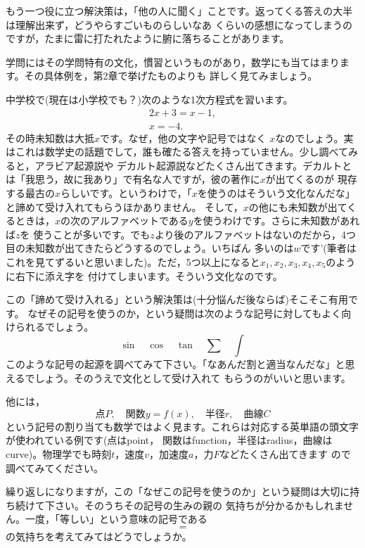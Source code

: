 \documentclass[./main]{subfiles}
\begin{document}
もう一つ役に立つ解決策は，「他の人に聞く」ことです。返ってくる答えの大半は理解出来ず，どうやらすごいものらしいなあ
くらいの感想になってしまうのですが，たまに雷に打たれたように腑に落ちることがあります。


学問にはその学問特有の文化，慣習というものがあり，数学にも当てはまります。その具体例を，第2章で挙げたものよりも
詳しく見てみましょう。

中学校で(現在は小学校でも？)次のような1次方程式を習います。
\begin{gather*}
2x + 3 = x - 1, \\
x = -4.
\end{gather*}
その時未知数は大抵$x$です。なぜ，他の文字や記号ではなく
$x$なのでしょう。実はこれは数学史の話題でして，誰も確たる答えを持っていません。少し調べてみると，アラビア起源説や
デカルト起源説などたくさん出てきます。デカルトとは「我思う，故に我あり」で有名な人ですが，彼の著作に$x$が出てくるのが
現存する最古の$x$らしいです。というわけで，「$x$を使うのはそういう文化なんだな」と諦めて受け入れてもらうほかありません。
そして，$x$の他にも未知数が出てくるときは，$x$の次のアルファベットである$y$を使うわけです。さらに未知数があれば$z$を
使うことが多いです。でも$z$より後のアルファベットはないのだから，4つ目の未知数が出てきたらどうするのでしょう。いちばん
多いのは$w$です'(筆者はこれを見てずるいと思いました)。ただ，5つ以上になると$x_1,x_2,x_3,x_4,x_5$のように右下に添え字を
付けてしまいます。そういう文化なのです。

この「諦めて受け入れる」という解決策は(十分悩んだ後ならば)そこそこ有用です。
なぜその記号を使うのか，という疑問は次のような記号に対してもよく向けられるでしょう。
\[
\sin \quad \cos \quad \tan \quad \sum \quad \int
\]
このような記号の起源を調べてみて下さい。「なあんだ割と適当なんだな」と思えるでしょう。そのうえで文化として受け入れて
もらうのがいいと思います。

他には，
\[点P,\quad 関数y=f(x),\quad 半径r, \quad 曲線C \]
という記号の割り当ても数学ではよく見ます。これらは対応する英単語の頭文字が使われている例です(点はpoint，
関数はfunction，半径はradius，曲線はcurve)。物理学でも時刻$t$，速度$v$，加速度$a$，力$F$などたくさん出てきます
ので調べてみてください。

繰り返しになりますが，この「なぜこの記号を使うのか」という疑問は大切に持ち続けて下さい。そのうちその記号の生みの親の
気持ちが分かるかもしれません。一度，「等しい」という意味の記号である
\[ = \]
の気持ちを考えてみてはどうでしょうか。

\end{document}
